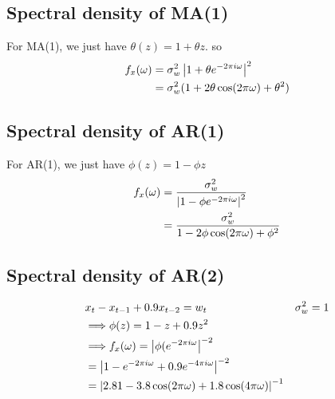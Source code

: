 \subsection{Spectral density of MA(1)}
For MA(1), we just have $\theta(z) = 1+\theta z$. so 
    \begin{align*}
        f_x(\omega) 
        & = \sigma_w^2 \left| 1 + \theta e^{-2\pi i \omega} \right|^2 \\
        & = \sigma_w^2 (1 + 2\theta \cos(2\pi \omega) + \theta^2)
    \end{align*}
    
\subsection{Spectral density of AR(1)}
For AR(1), we just have $\phi(z) = 1 - \phi z$
    \begin{align*}
        f_x(\omega)
        & = \frac{\sigma_w^2}{\left| 1 - \phi e^{-2\pi i \omega} \right|^2} \\
        & = \frac{\sigma_w^2}{1 - 2\phi \cos(2\pi \omega) + \phi^2}\\
    \end{align*}
    
\subsection{Spectral density of AR(2)}
    \begin{align*}
        & x_t - x_{t-1} + 0.9 x_{t-2} = w_t & \sigma_w^2 = 1\\
        & \Longrightarrow \phi(z) = 1-z + 0.9z^2 \\
        & \Longrightarrow f_x(\omega) = \left| \phi(e^{-2\pi i \omega} \right|^{-2} \\
        & = \left| 1 - e^{-2\pi i \omega} + 0.9 e^{-4\pi i \omega} \right|^{-2}\\
        & = \left|  2.81 - 3.8 \cos(2\pi \omega) + 1.8 \cos(4\pi\omega) \right|^{-1}
    \end{align*}